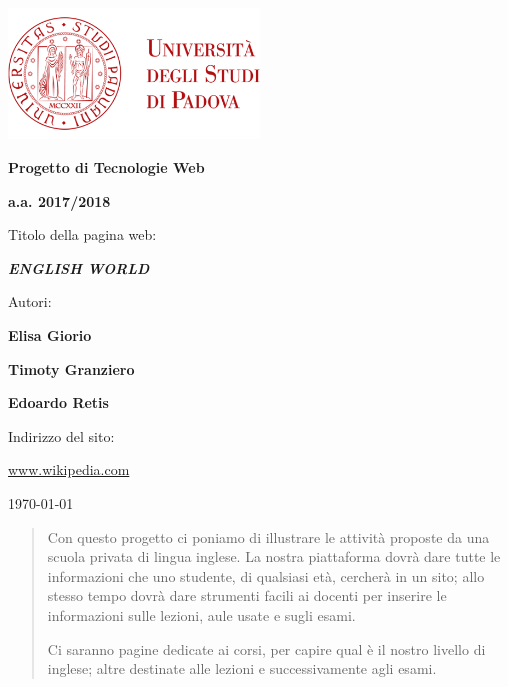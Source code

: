 \documentclass[12pt, a4paper]{article}
\begin{document}
\frenchspacing
\begin{titlepage}
	\centering
	\includegraphics[width=0.50\textwidth]{img/logo_unipd_color.png}\par\vspace{1cm} %
	
	{\LARGE\bfseries Progetto di Tecnologie Web \par}
	\vspace{1cm}
	
	{\Large\bfseries a.a. 2017/2018 \par}
	\vspace{2cm}
	
	{\Large Titolo della pagina web: \par}
	\vspace{0.5cm}
	
	{\LARGE\bfseries\itshape ENGLISH WORLD \par}
	
	\vfill 

	Autori: \par
	{\bfseries Elisa Giorio \par}
	{\bfseries Timoty Granziero \par}
	{\bfseries Edoardo Retis \par}
	
	\vfill

	Indirizzo del sito: \par
	\url{www.wikipedia.com}
	\vfill
	
	{\large \today\par}
	
\end{titlepage}

\tableofcontents 
\pagebreak

\begin{abstract}
Con questo progetto ci poniamo di illustrare le attività proposte da una scuola privata di lingua inglese. La nostra piattaforma dovrà dare tutte le informazioni che uno studente, di qualsiasi età, cercherà in un sito; allo stesso tempo dovrà dare strumenti facili ai docenti per inserire le informazioni sulle lezioni, aule usate e sugli esami.\par
Ci saranno pagine dedicate ai corsi, per capire qual è il nostro livello di inglese; altre destinate alle lezioni e successivamente agli esami.
\end{abstract}
\end{document}
